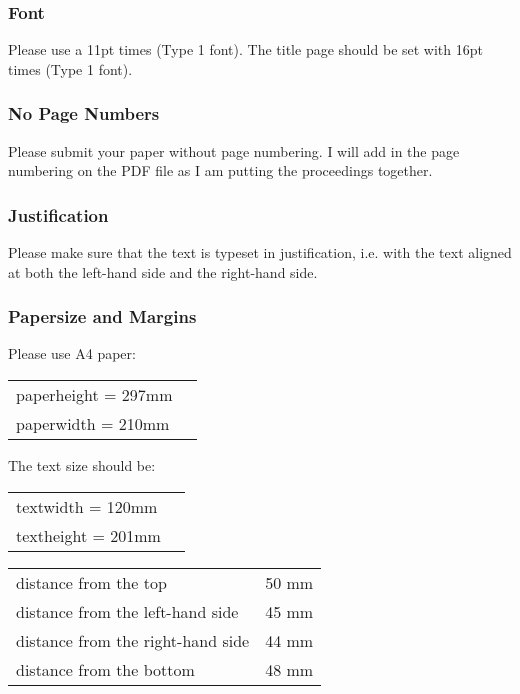 \documentclass[11pt,a4paper,fleqn]{article}
\begin{document}
\subsubsection{Font}

Please use a 11pt times (Type 1 font). The title page should be set with 16pt times (Type 1 font).

\subsubsection{No Page Numbers}

Please submit your paper without page numbering.  I will add in
the page numbering on the PDF file as I am putting the
proceedings together.

\subsubsection{Justification}

Please make sure that the text is typeset in justification,
i.e. with the text aligned at both the left-hand side and the right-hand side.

\subsubsection{Papersize and Margins}
\label{margins}

Please use A4 paper:
\begin{table}[H]
\begin{tabular}{@{}ll}
paperheight  = 297mm\\
paperwidth   = 210mm
\end{tabular}
\end{table}
%
The text size should be:
\begin{table}[H]
\begin{tabular}{@{}ll}
textwidth  = 120mm\\
textheight = 201mm
\end{tabular}
\end{table}

\begin{table}[H]
\begin{tabular}{@{}l@{ = }l}
distance from the top & 50 mm\\
distance from the left-hand side & 45 mm\\
distance from the right-hand side & 44 mm\\
distance from the bottom & 48 mm\\
\end{tabular}
\end{table}
\end{document}
